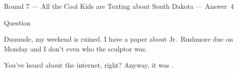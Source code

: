 \documentclass[11pt]{beamer}
\begin{document}
\begin{frame}[t]{Round 7 --- All the Cool Kids are Texting about South Dakota --- \mbox{Answer 4}}
\begin{block}{Question}

\begin{minipage}{0.9\textwidth}
\begin{mdframed}[
    roundcorner=7pt,
    backgroundcolor=black!5,
    linecolor=black!5,
    fontcolor=black,
    ignorelastdescenders]
\begin{flushleft}
{\small{}\selectfont{}
Duuuude, my weekend is ruined.  I have a paper about Jr.\ Rushmore due on Monday and I don't even who the sculptor was.
}
\end{flushleft}
\end{mdframed}
\end{minipage}

\hfill{}\begin{minipage}{0.9\textwidth}
\begin{mdframed}[
    roundcorner=7pt,
    backgroundcolor=blue!80!white,
    linecolor=blue!80!white,
    fontcolor=white,
    ignorelastdescenders]
\begin{flushleft}
{\small{}\selectfont{}
You've heard about the internet, right? Anyway, it was \textunderscore{}\textunderscore{}\textunderscore{}\textunderscore{}\textunderscore{}\textunderscore{} \textunderscore{}\textunderscore{}\textunderscore{}\textunderscore{}\textunderscore{}\textunderscore{}.
}
\end{flushleft}
\end{mdframed}
\end{minipage}
\end{block}
\end{frame}
\end{document}
